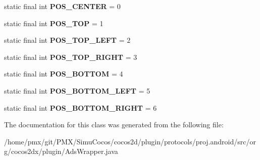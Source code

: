 \begin{DoxyCompactItemize}
static final int {\bfseries P\+O\+S\+\_\+\+C\+E\+N\+T\+ER} = 0
\item 
\mbox{\label{classorg_1_1cocos2dx_1_1plugin_1_1AdsWrapper_a4adbeb4bb9a42c71d0861b40ec6e35ec}} 
static final int {\bfseries P\+O\+S\+\_\+\+T\+OP} = 1
\item 
\mbox{\label{classorg_1_1cocos2dx_1_1plugin_1_1AdsWrapper_a0fd7a7f970b7d804ba769ba2f290353d}} 
static final int {\bfseries P\+O\+S\+\_\+\+T\+O\+P\+\_\+\+L\+E\+FT} = 2
\item 
\mbox{\label{classorg_1_1cocos2dx_1_1plugin_1_1AdsWrapper_a279fe344fd3675d587787758e961bc0a}} 
static final int {\bfseries P\+O\+S\+\_\+\+T\+O\+P\+\_\+\+R\+I\+G\+HT} = 3
\item 
\mbox{\label{classorg_1_1cocos2dx_1_1plugin_1_1AdsWrapper_a81e8798d547cd83b0c03e73673a4be07}} 
static final int {\bfseries P\+O\+S\+\_\+\+B\+O\+T\+T\+OM} = 4
\item 
\mbox{\label{classorg_1_1cocos2dx_1_1plugin_1_1AdsWrapper_a1e73f252b92ee27a98fd5b4e9e590db0}} 
static final int {\bfseries P\+O\+S\+\_\+\+B\+O\+T\+T\+O\+M\+\_\+\+L\+E\+FT} = 5
\item 
\mbox{\label{classorg_1_1cocos2dx_1_1plugin_1_1AdsWrapper_afcdbba397434a041e5b9d30e1d4972f1}} 
static final int {\bfseries P\+O\+S\+\_\+\+B\+O\+T\+T\+O\+M\+\_\+\+R\+I\+G\+HT} = 6
\end{DoxyCompactItemize}


The documentation for this class was generated from the following file\+:\begin{DoxyCompactItemize}
\item 
/home/pmx/git/\+P\+M\+X/\+Simu\+Cocos/cocos2d/plugin/protocols/proj.\+android/src/org/cocos2dx/plugin/Ads\+Wrapper.\+java\end{DoxyCompactItemize}
